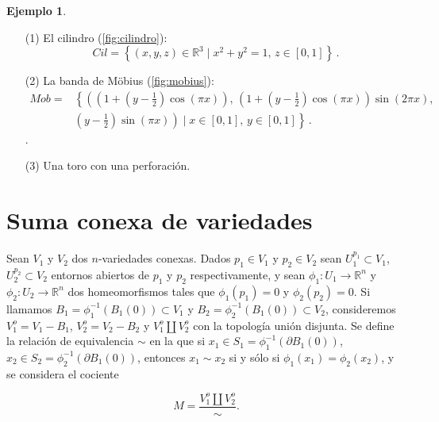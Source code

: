 \documentclass[10pt]{report}
\newcommand{\R}{\mathbb{R}}
\theoremstyle{definition}
\newtheorem{eje}[defin]{Ejemplo}
\begin{document}
\begin{eje}\label{eje:rep_borde}
\begin{itemize}
\item[(1)] El cilindro  (\autoref{fig:cilindro}): $$Cil=\left\{(x,y,z)\in \R^3 \mid x^2+y^2=1,\, z\in \left[ 0,1\right] \right\} \,.$$
\item[(2)] La banda de Möbius (\autoref{fig:mobius}):
\begin{align*}
Mob=
& \left\{ \left(\left(1+\left(y-\frac{1}{2}\right)\cos \left(\pi x\right)\right), \, \left(1+\left(y-\frac{1}{2}\right)\cos \left(\pi x\right)\right)\sin \left( 2 \pi x\right), \right. \right.\\
& \left. \left. \left( y-\frac{1}{2} \right)\sin \left( \pi x\right)\right) \mid x\in \left[0,1\right], \, y\in \left[0,1\right] \right\} \, .
\end{align*}.
\item[(3)] Una toro con una perforación.
\end{itemize}
\end{eje}


\section{Suma conexa de variedades}
Sean $V_1$ y $V_2$ dos $n$-variedades conexas. Dados $p_1\in V_1$ y $p_2\in V_2$ sean $U_1^{p_1}\subset V_1$, $U_2^{p_2}\subset V_2$  entornos abiertos de $p_1$ y $p_2$ respectivamente, y sean $\phi_1:U_1\to\R^n$ y $\phi_2:U_2\to\R^n$ dos homeomorfismos tales que $\phi_1(p_1)=0$ y $\phi_2(p_2)=0$. Si llamamos $B_1=\phi_1^{-1}(B_1(0))\subset V_1$ y $B_2=\phi_2^{-1}(B_1(0))\subset V_2$, consideremos $V_1^o=V_1-B_1$, $V_2^o=V_2-B_2$ y $V_1^o \amalg V_2^o$ con la topología unión disjunta.
Se define la relación de equivalencia $\sim$ en la que si $x_1\in S_1=\phi_1^{-1}(\partial B_1(0))$, $x_2\in S_2=\phi_2^{-1}(\partial B_1(0))$, entonces $x_1\sim x_2$ si y sólo si $\phi_1(x_1)=\phi_2(x_2)$, y se considera el cociente 

$$M=\frac{V_1^o\amalg V_2^o}{\sim}.$$
\end{document}
